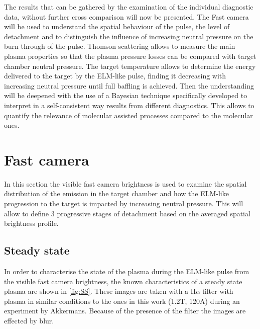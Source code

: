 The results that can be gathered by the examination of the individual diagnostic data, without further cross comparison will now be presented. The Fast camera will be used to understand the spatial behaviour of the pulse, the level of detachment and to distinguish the influence of increasing neutral pressure on the burn through of the pulse. Thomson scattering allows to measure the main plasma properties so that the plasma pressure losses can be compared with target chamber neutral pressure. The target temperature allows to determine the energy delivered to the target by the ELM-like pulse, finding it decreasing with increasing neutral pressure until full baffling is achieved.
Then the understanding will be deepened with the use of a Bayesian technique specifically developed to interpret in a self-consistent way results from different diagnostics. This allows to quantify the relevance of molecular assisted processes compared to the molecular ones.


\section{Fast camera}\label{Fast camera}
In this section the visible fast camera brightness is used to examine the spatial distribution of the emission in the target chamber and how the ELM-like progression to the target is impacted by increasing neutral pressure. This will allow to define 3 progressive stages of detachment based on the averaged spatial brightness profile.

\subsection{Steady state}\label{Steady state}


In order to characterise the state of the plasma during the ELM-like pulse from the visible fast camera brightness, the known characteristics of a steady state plasma are shown in \autoref{fig:SS}. \cite{Akkermans2020,Perillo2019}
These images are taken with a H$\alpha$ filter with plasma in similar conditions to the ones in this work (1.2T, 120A) during an experiment by Akkermans.\cite{Akkermans2020} Because of the presence of the filter the images are effected by blur.

